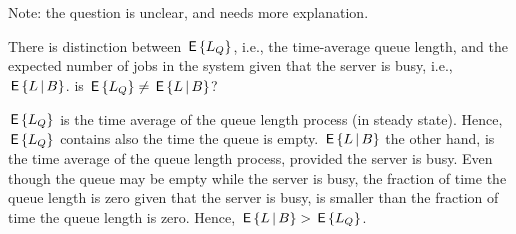 \begin{question}[use=false] Note: the question is unclear, and needs more explanation. 

  There is distinction between $\,\mathsf{E}\left\{L_Q\right\}$, i.e., the time-average queue
  length, and the expected number of jobs in the system given that the
  server is busy, i.e., $\,\mathsf{E}\left\{L\,\middle|\, B\right\}$.  is $\,\mathsf{E}\left\{L_Q\right\} \neq \,\mathsf{E}\left\{L\,\middle|\, B\right\}$?
\begin{solution}
  $\,\mathsf{E}\left\{L_Q\right\}$ is the time average of the queue length process (in steady
  state). Hence, $\,\mathsf{E}\left\{L_Q\right\}$ contains also the time the queue is
  empty. $\,\mathsf{E}\left\{L\,\middle|\, B\right\}$ the other hand, is the time average of the
  queue length process, provided the server is busy. Even though the
  queue may be empty while the server is busy, the fraction of time
  the queue length is zero given that the server is busy, is smaller
  than the fraction of time the queue length is zero.  Hence,
  $\,\mathsf{E}\left\{L\,\middle|\, B\right\} > \,\mathsf{E}\left\{L_Q\right\}$.
\end{solution}
\end{question}

